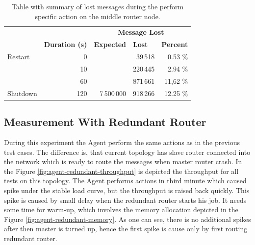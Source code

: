 \begingroup
\setlength{\tabcolsep}{10pt} %
\renewcommand{\arraystretch}{1.35} %
	\begin{table}[H]
	\centering
	\caption{Table with summary of lost messages during the perform specific action on the middle router node.}
	\label{tab:agent_demonstration}
	\begin{tabular}{|l|r|r|r|r|}
	\hline
	\rowcolor[HTML]{C5E3DF}
	\cellcolor[HTML]{C5E3DF} & \multicolumn{1}{c|}{\cellcolor[HTML]{C5E3DF}} & \multicolumn{3}{c|}{\cellcolor[HTML]{C5E3DF}\textbf{Message Lost}} \\ \cline{3-5}
	\rowcolor[HTML]{C5E3DF}
	\multirow{-2}{*}{\cellcolor[HTML]{C5E3DF}\textbf{Action}} & \multicolumn{1}{c|}{\multirow{-2}{*}{\cellcolor[HTML]{C5E3DF}\textbf{Duration (s)}}} & \multicolumn{1}{l|}{\cellcolor[HTML]{C5E3DF}\textbf{Expected}} & \multicolumn{1}{l|}{\cellcolor[HTML]{C5E3DF}\textbf{Lost}} & \multicolumn{1}{l|}{\cellcolor[HTML]{C5E3DF}\textbf{Percent}} \\ \hline
	Restart & 0 & & 39\,518 & 0.53 \% \\ \cline{1-2} \cline{4-5}
	 & 10 & & 220\,445 & 2.94 \% \\ \cline{2-2} \cline{4-5}
	 & 60 & & 871\,661 & 11,62 \% \\ \cline{2-2} \cline{4-5}
	\multirow{-3}{*}{Shutdown} & 120 & \multirow{-4}{*}{7\,500\,000} & 918\,266 & 12.25 \% \\ \hline
	\end{tabular}
	\end{table}
\endgroup


\subsection{Measurement With Redundant Router}
During this experiment the Agent perform the same actions as in the previous test cases. The difference is, that current topology has slave router connected into the network which is ready to route the messages when master router crash. In the Figure \ref{fig:agent-redundant-throughput} is depicted the throughput for all tests on this topology. The Agent performs actions in third minute which caused spike under the stable load curve, but the throughput is raised back quickly. This spike is caused by small delay when the redundant router starts his job. It needs some time for warm-up, which involves the memory allocation depicted in the Figure \ref{fig:agent-redundant-memory}. As one can see, there is no additional spikes after then master is turned up, hence the first spike is cause only by first routing redundant router.

